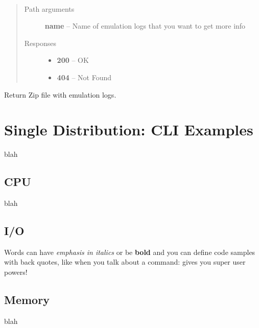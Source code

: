 \documentclass[letterpaper,10pt,english]{sphinxmanual}
\begin{document}

\begin{fulllineitems}
\label{01_how_to_use_it:method-get-logs-name-}~\begin{quote}\begin{description}
\item[{Path arguments}] \leavevmode
\textbf{name} -- Name of emulation logs that you want to get more info

\item[{Responses}] \leavevmode\begin{itemize}
\item {} 
\textbf{200} -- OK

\item {} 
\textbf{404} -- Not Found

\end{itemize}

\end{description}\end{quote}

Return Zip file with emulation logs.

\end{fulllineitems}



\section{Single Distribution: CLI Examples}
\label{02_cli_examples:single-distribution-cli-examples}\label{02_cli_examples::doc}
blah


\subsection{CPU}
\label{02_cli_examples:cpu}
blah


\subsection{I/O}
\label{02_cli_examples:i-o}
Words can have \emph{emphasis in italics} or be \textbf{bold} and you can
define code samples with back quotes, like when you talk about a
command:  gives you super user powers!


\subsection{Memory}
\label{02_cli_examples:memory}
blah
\end{document}
